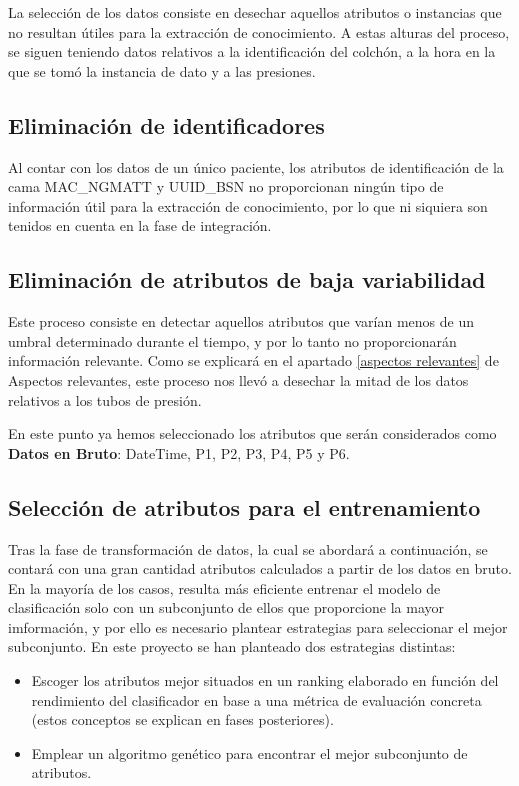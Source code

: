 La selección de los datos consiste en desechar aquellos atributos o instancias que no resultan útiles para la extracción de conocimiento. A estas alturas del proceso, se siguen teniendo datos relativos a la identificación del colchón, a la hora en la que se tomó la instancia de dato y a las presiones. 

\subsection{Eliminación de identificadores}

Al contar con los datos de un único paciente, los atributos de identificación de la cama MAC\_NGMATT y UUID\_BSN no proporcionan ningún tipo de información útil para la extracción de conocimiento, por lo que ni siquiera son tenidos en cuenta en la fase de integración. 

\subsection{Eliminación de atributos de baja variabilidad}

Este proceso consiste en detectar aquellos atributos que varían menos de un umbral determinado durante el tiempo, y por lo tanto no proporcionarán información relevante. Como se explicará en el apartado \ref{aspectos relevantes} de Aspectos relevantes, este proceso nos llevó a desechar la mitad de los datos relativos a los tubos de presión. 

En este punto ya hemos seleccionado los atributos que serán considerados como \textbf{Datos en Bruto}: DateTime, P1, P2, P3, P4, P5 y P6.

\subsection{Selección de atributos para el entrenamiento}

Tras la fase de transformación de datos, la cual se abordará a continuación, se contará con una gran cantidad atributos calculados a partir de los datos en bruto. En la mayoría de los casos, resulta más eficiente entrenar el modelo de clasificación solo con un subconjunto de ellos que proporcione la mayor imformación, y por ello es necesario plantear estrategias para seleccionar el mejor subconjunto. En este proyecto se han planteado dos estrategias distintas: 

\begin{itemize}
	\item Escoger los atributos mejor situados en un ranking elaborado en función del rendimiento del clasificador en base a una métrica de evaluación concreta (estos conceptos se explican en fases posteriores). 
	\item Emplear un algoritmo genético para encontrar el mejor subconjunto de atributos. 
\end{itemize}

